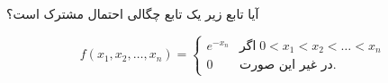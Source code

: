 \problem{}
آیا تابع زیر یک تابع چگالی احتمال مشترک است؟

\[
f(x_1, x_2, \dots, x_n) =
\begin{cases}
e^{-x_n} & \text{اگر} \; 0 < x_1 < x_2 < \dots < x_n \\
0 & \text{در غیر این صورت}.
\end{cases}
\]
